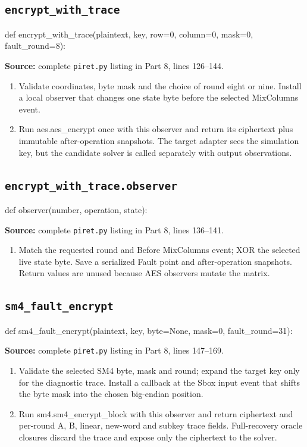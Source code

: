 \subsection{\texttt{encrypt\_\allowbreak{}with\_\allowbreak{}trace}}
\begin{lightcode}
def encrypt_with_trace(plaintext, key, row=0, column=0, mask=0, fault_round=8):
\end{lightcode}
\noindent\textbf{Source:} complete \texttt{piret.py} listing in Part 8, lines 126--144.
\begin{enumerate}
\item Validate coordinates, byte mask and the choice of round eight or nine. Install a local observer that changes one state byte before the selected MixColumns event.
\item Run aes.aes\_encrypt once with this observer and return its ciphertext plus immutable after-operation snapshots. The target adapter sees the simulation key, but the candidate solver is called separately with output observations.
\end{enumerate}
\subsection{\texttt{encrypt\_\allowbreak{}with\_\allowbreak{}trace.observer}}
\begin{lightcode}
def observer(number, operation, state):
\end{lightcode}
\noindent\textbf{Source:} complete \texttt{piret.py} listing in Part 8, lines 136--141.
\begin{enumerate}
\item Match the requested round and Before MixColumns event; XOR the selected live state byte. Save a serialized Fault point and after-operation snapshots. Return values are unused because AES observers mutate the matrix.
\end{enumerate}
\subsection{\texttt{sm4\_\allowbreak{}fault\_\allowbreak{}encrypt}}
\begin{lightcode}
def sm4_fault_encrypt(plaintext, key, byte=None, mask=0, fault_round=31):
\end{lightcode}
\noindent\textbf{Source:} complete \texttt{piret.py} listing in Part 8, lines 147--169.
\begin{enumerate}
\item Validate the selected SM4 byte, mask and round; expand the target key only for the diagnostic trace. Install a callback at the Sbox input event that shifts the byte mask into the chosen big-endian position.
\item Run sm4.sm4\_encrypt\_block with this observer and return ciphertext and per-round A, B, linear, new-word and subkey trace fields. Full-recovery oracle closures discard the trace and expose only the ciphertext to the solver.
\end{enumerate}

